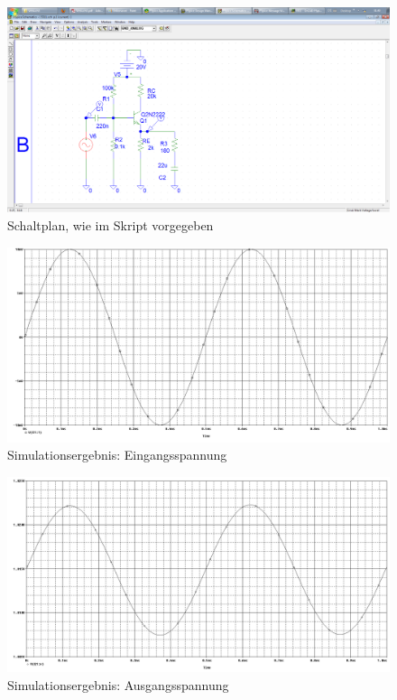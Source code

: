 \begin{figure}[H]
	\centering
	\includegraphics[width=\linewidth]{versuch5/spice/s5312.png}
	\caption{Schaltplan, wie im Skript vorgegeben}
\end{figure}
\begin{figure}[H]
	\centering
	\includegraphics[width=\linewidth]{versuch5/spice/5311e.png}
	\caption{Simulationsergebnis: Eingangsspannung}
\end{figure}
\begin{figure}[H]
	\centering
	\includegraphics[width=\linewidth]{versuch5/spice/5311a.png}
	\caption{Simulationsergebnis: Ausgangsspannung}
\end{figure}
